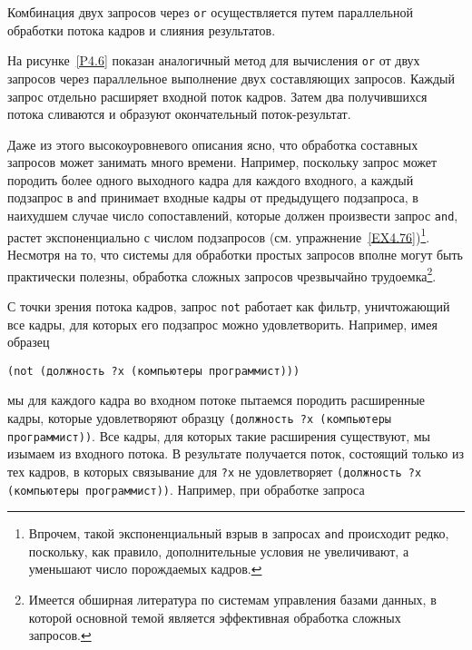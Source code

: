 \begin{cntrfig}

\caption{Комбинация двух запросов через
{\tt or} осуществляется путем параллельной обработки потока кадров
и слияния результатов.
}
\label{P4.6}%
\end{cntrfig}

На рисунке~\ref{P4.6} показан аналогичный
метод для вычисления {\tt or} от двух запросов через
параллельное выполнение двух составляющих запросов.  Каждый запрос отдельно
расширяет входной поток кадров.  Затем два получившихся потока
сливаются и образуют окончательный поток-результат.

Даже из этого
высокоуровневого описания ясно, что
обработка составных запросов может занимать много времени.  Например,
поскольку запрос может породить более одного выходного кадра для
каждого входного, а каждый подзапрос в {\tt and} принимает
входные кадры от предыдущего подзапроса, в наихудшем случае число
сопоставлений, которые должен произвести запрос {\tt and},
растет экспоненциально с числом подзапросов 
(см. упражнение~\ref{EX4.76})\footnote{Впрочем, такой экспоненциальный 
взрыв в запросах {\tt and} происходит редко, поскольку, как правило,
дополнительные условия не увеличивают, а уменьшают число порождаемых
кадров.}.
Несмотря на то, что системы для обработки простых запросов вполне могут быть
практически полезны, обработка сложных запросов чрезвычайно 
трудоемка\footnote{Имеется обширная литература по системам управления
базами данных, в которой основной темой является эффективная
обработка сложных запросов.}.

С точки зрения потока кадров, запрос {\tt not}
работает как фильтр, уничтожающий все кадры, для которых его подзапрос
можно удовлетворить.  Например, имея образец

\begin{Verbatim}[fontsize=\small]
(not (должность ?x (компьютеры программист)))
\end{Verbatim}
мы для каждого кадра во входном потоке пытаемся породить расширенные
кадры, которые удовлетворяют образцу {\tt (должность ?x (компьютеры
про\-г\-раммист))}.  Все кадры, для которых такие расширения
существуют, мы изымаем из входного потока.  В результате получается
поток, состоящий только из тех кадров, в которых связывание для
{\tt ?x} не удовлетворяет {\tt (должность ?x (компьютеры
программист))}.  Например, при обработке запроса
{\sloppy

} %

